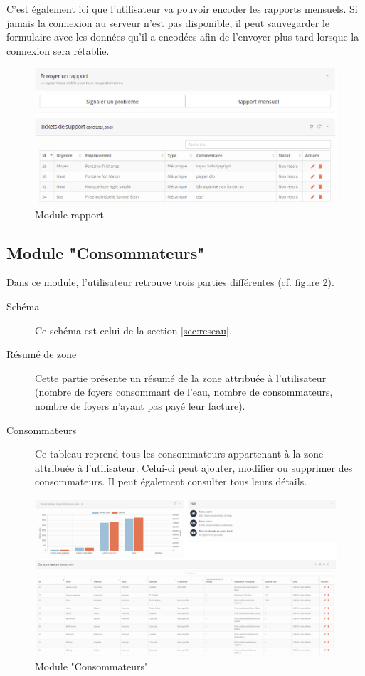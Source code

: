 \documentclass{EPL-master-thesis-covers-FR}
\begin{document}
				C'est également ici que l'utilisateur va pouvoir encoder les rapports mensuels. Si jamais la connexion au serveur n'est pas disponible, il peut sauvegarder le formulaire avec les données qu'il a encodées afin de l'envoyer plus tard lorsque la connexion sera rétablie.
				
				\begin{figure}[H]
					\centering
					\includegraphics[width=1\textwidth]{images/report}
					\caption{Module rapport}
					\label{fig:rapport}
				\end{figure}
			
			
			\subsection*{Module "Consommateurs"}
				Dans ce module, l'utilisateur retrouve trois parties différentes (cf. figure \ref{fig:consumer}).
				\begin{description}
					\item[Schéma] Ce schéma est celui de la section \ref{sec:reseau}.
					\item[Résumé de zone] Cette partie présente un résumé de la zone attribuée à l'utilisateur (nombre de foyers consommant de l'eau, nombre de consommateurs, nombre de foyers n'ayant pas payé leur facture).
					\item[Consommateurs] Ce tableau reprend tous les consommateurs appartenant à la zone attribuée à l'utilisateur. Celui-ci peut ajouter, modifier ou supprimer des consommateurs. Il peut également consulter tous leurs détails.
				\end{description}
				

				
				\begin{figure}[H]
					\centering
					\includegraphics[width=1\textwidth]{images/consumer}
					\caption{Module "Consommateurs"}
					\label{fig:consumer}
				\end{figure}
				
\end{document}
